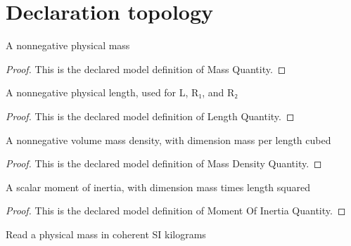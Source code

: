 \section{Declaration topology}
\begin{definition}
  \label{def:physics:phyx-mini-0822:phyxminiproblems-problemphyxmini0822-massquantity}
  A nonnegative physical mass
\end{definition}
\begin{proof}
  This is the declared model definition of Mass Quantity.
\end{proof}
\begin{definition}
  \label{def:physics:phyx-mini-0822:phyxminiproblems-problemphyxmini0822-lengthquantity}
  A nonnegative physical length, used for L, R₁, and R₂
\end{definition}
\begin{proof}
  This is the declared model definition of Length Quantity.
\end{proof}
\begin{definition}
  \label{def:physics:phyx-mini-0822:phyxminiproblems-problemphyxmini0822-massdensityquantity}
  A nonnegative volume mass density, with dimension mass per length cubed
\end{definition}
\begin{proof}
  This is the declared model definition of Mass Density Quantity.
\end{proof}
\begin{definition}
  \label{def:physics:phyx-mini-0822:phyxminiproblems-problemphyxmini0822-momentofinertiaquantity}
  A scalar moment of inertia, with dimension mass times length squared
\end{definition}
\begin{proof}
  This is the declared model definition of Moment Of Inertia Quantity.
\end{proof}
\begin{definition}
  \label{def:physics:phyx-mini-0822:phyxminiproblems-problemphyxmini0822-massinkilograms}
  Read a physical mass in coherent SI kilograms
\end{definition}
